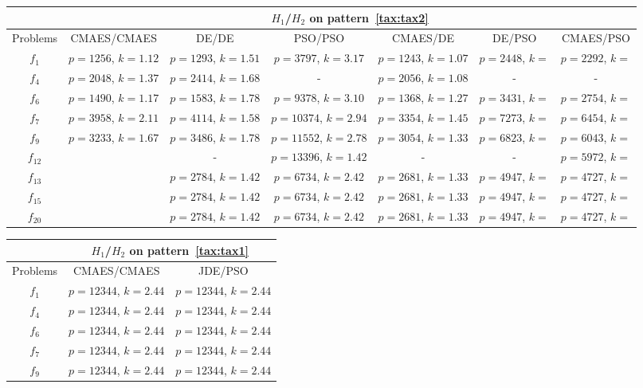 \documentclass{sig-alternate}
\begin{document}
\begin{table}
    \begin{tabular}{c|c|c|c|c|c|c|}
        & \multicolumn{6}{c}{$H_1$/$H_2$ on pattern~\ref{tax:tax2}} \\\hline
        Problems & CMAES/CMAES        & DE/DE              & PSO/PSO               & CMAES/DE            & DE/PSO              & CMAES/PSO \\\hline
        $f_1$    & $p=1256$, $k=1.12$ & $p=1293$, $k=1.51$ & $p=3797$,  $k=3.17$   & $p=1243$, $k=1.07$  & $p=2448$, $k=$  & $p=2292$, $k=$\\
        $f_4$    & $p=2048$, $k=1.37$ & $p=2414$, $k=1.68$ & -                     & $p=2056$, $k=1.08$  & -               & -             \\
        $f_6$    & $p=1490$, $k=1.17$ & $p=1583$, $k=1.78$ & $p=9378$,  $k=3.10$   & $p=1368$, $k=1.27$  & $p=3431$, $k=$  & $p=2754$, $k=$\\
        $f_7$    & $p=3958$, $k=2.11$ & $p=4114$, $k=1.58$ & $p=10374$, $k=2.94$   & $p=3354$, $k=1.45$  & $p=7273$, $k=$  & $p=6454$, $k=$\\
        $f_9$    & $p=3233$, $k=1.67$ & $p=3486$, $k=1.78$ & $p=11552$, $k=2.78$   & $p=3054$, $k=1.33$  & $p=6823$, $k=$  & $p=6043$, $k=$\\
        $f_{12}$ &                    & -                  & $p=13396$, $k=1.42$   & -                   & -               & $p=5972$, $k=$\\
        $f_{13}$ &                    & $p=2784$, $k=1.42$ & $p=6734$,  $k=2.42$   & $p=2681$, $k=1.33$  & $p=4947$, $k=$  & $p=4727$, $k=$\\
        $f_{15}$ &                    & $p=2784$, $k=1.42$ & $p=6734$,  $k=2.42$   & $p=2681$, $k=1.33$  & $p=4947$, $k=$  & $p=4727$, $k=$\\
        $f_{20}$ &                    & $p=2784$, $k=1.42$ & $p=6734$,  $k=2.42$   & $p=2681$, $k=1.33$  & $p=4947$, $k=$  & $p=4727$, $k=$\\
    \end{tabular}
\end{table}

\begin{table}
    \begin{tabular}{c|c|c}
        & \multicolumn{2}{c}{$H_1$/$H_2$ on pattern~\ref{tax:tax1}} \\\hline
        Problems & CMAES/CMAES         & JDE/PSO \\\hline
        $f_1$    & $p=12344$, $k=2.44$ & $p=12344$, $k=2.44$ \\
        $f_4$    & $p=12344$, $k=2.44$ & $p=12344$, $k=2.44$ \\
        $f_6$    & $p=12344$, $k=2.44$ & $p=12344$, $k=2.44$ \\
        $f_7$    & $p=12344$, $k=2.44$ & $p=12344$, $k=2.44$ \\
        $f_9$    & $p=12344$, $k=2.44$ & $p=12344$, $k=2.44$ \\
    \end{tabular}
\end{table}
\end{document}
